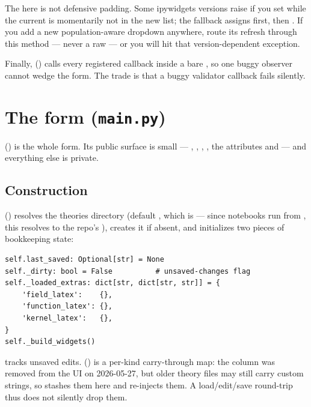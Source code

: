 \begin{gotcha}
The  here is not defensive padding. Some ipywidgets versions raise
if you set  while the current  is momentarily not in
the new list; the fallback assigns  first, then . If you
add a new population-aware dropdown anywhere, route its refresh through this method
--- never a raw  --- or you will hit that version-dependent
exception.
\end{gotcha}

Finally,  () calls every
registered  callback inside a bare ,
so one buggy observer cannot wedge the form. The trade is that a buggy validator
callback fails silently.

\section{The form (\texttt{main.py})}

 () is the whole form. Its public
surface is small --- , , , ,
the attributes  and  --- and everything else
is private.

\subsection{Construction}

 ()
resolves the theories directory (default , which is
 --- since notebooks run from , this
resolves to the repo's ), creates it if absent, and initializes
two pieces of bookkeeping state:

\begin{lstlisting}
self.last_saved: Optional[str] = None
self._dirty: bool = False          # unsaved-changes flag
self._loaded_extras: dict[str, dict[str, str]] = {
    'field_latex':    {},
    'function_latex': {},
    'kernel_latex':   {},
}
self._build_widgets()
\end{lstlisting}

 tracks unsaved edits. 
() is a per-kind  carry-through
map: the  column was removed from the UI on 2026-05-27, but older
theory files may still carry custom  strings, so  stashes
them here and  re-injects them. A load/edit/save round-trip thus
does not silently drop them.

